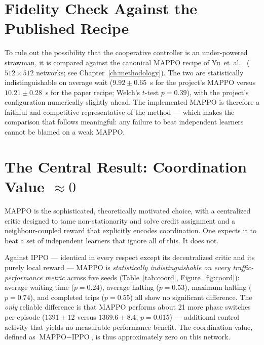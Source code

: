 \section{Fidelity Check Against the Published Recipe}
To rule out the possibility that the cooperative controller is an under-powered
strawman, it is compared against the canonical MAPPO recipe of
Yu~et~al.~\cite{yu2021mappo} ($512 \times 512$ networks; see
Chapter~\ref{ch:methodology}). The two are statistically indistinguishable on
average wait ($9.92 \pm 0.65$~s for the project's MAPPO versus $10.21 \pm 0.28$~s for
the paper recipe; Welch's $t$-test $p = 0.39$), with the project's configuration
numerically slightly ahead. The implemented MAPPO is therefore a faithful and
competitive representative of the method --- which makes the comparison that follows
meaningful: any failure to beat independent learners cannot be blamed on a weak
MAPPO.

\section{The Central Result: Coordination Value \texorpdfstring{$\approx 0$}{= 0}}
\label{sec:twist}
MAPPO is the sophisticated, theoretically motivated choice, with a centralized critic
designed to tame non-stationarity and solve credit assignment and a neighbour-coupled
reward that explicitly encodes coordination. One expects it to beat a set of
independent learners that ignore all of this. It does not.

Against IPPO --- identical in every respect except its decentralized critic and its
purely local reward --- MAPPO is \emph{statistically indistinguishable on every
traffic-performance metric} across five seeds (Table~\ref{tab:coord},
Figure~\ref{fig:coord}): average waiting time ($p = 0.24$), average halting
($p = 0.53$), maximum halting ($p = 0.74$), and completed trips ($p = 0.55$) all show
no significant difference. The \emph{only} reliable difference is that MAPPO performs
about 21 more phase switches per episode ($1391 \pm 12$ versus $1369.6 \pm 8.4$,
$p = 0.015$) --- additional control activity that yields no measurable performance
benefit. The coordination value, defined as $\text{MAPPO} - \text{IPPO}$, is thus
approximately zero on this network.

